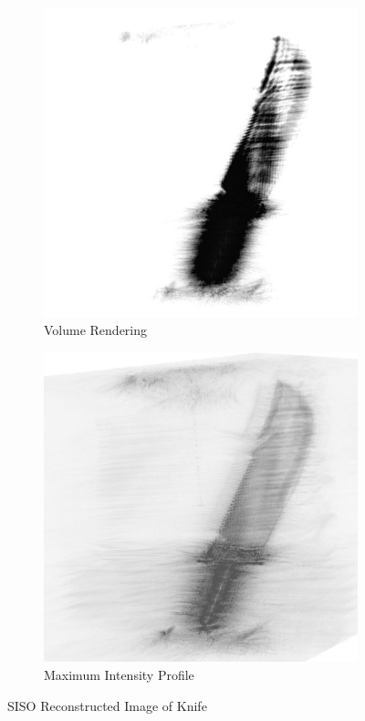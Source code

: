 \documentclass[conference]{IEEEtran}
\begin{document}
		\begin{figure} [h]
			\begin{subfigure}{.5\linewidth}
				\centering
				\includegraphics[width=1\linewidth]{../MatlabResults/knife_SISO_vr}
				\caption{Volume Rendering}
				\label{fig:knife_SISO_vr}
			\end{subfigure}%
			\begin{subfigure}{.5\linewidth}
				\centering
				\includegraphics[width=1\linewidth]{../MatlabResults/knife_SISO_mip}
				\caption{Maximum Intensity Profile}
				\label{fig:knife_SISO_mip}
			\end{subfigure}
			\caption{SISO Reconstructed Image of Knife}
			\label{fig:knife_SISO}
		\end{figure}
		
\end{document}
